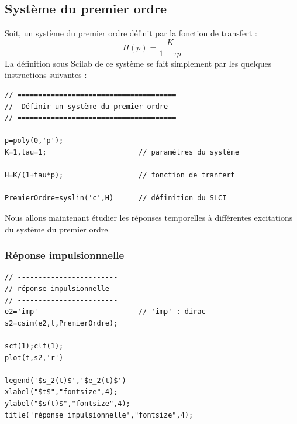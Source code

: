 \subsection{Système du premier ordre}
Soit, un système du premier ordre définit par la fonction de transfert : 
$$
H(p)=\dfrac{K}{1+\tau p }
$$
La définition sous Scilab de ce système se fait simplement par les quelques 
instructions suivantes :
\begin{code}
\begin{verbatim}
// ======================================
//  Définir un système du premier ordre
// ======================================

p=poly(0,'p');
K=1,tau=1;                      // paramètres du système

H=K/(1+tau*p);                  // fonction de tranfert

PremierOrdre=syslin('c',H)      // définition du SLCI
\end{verbatim}
\end{code}


Nous allons maintenant étudier les réponses temporelles 
à différentes excitations du système du premier ordre.
\subsubsection{Réponse impulsionnnelle}
\begin{code}
\begin{verbatim}
// ------------------------
// réponse impulsionnelle
// ------------------------
e2='imp'                        // 'imp' : dirac
s2=csim(e2,t,PremierOrdre);   

scf(1);clf(1);
plot(t,s2,'r')

legend('$s_2(t)$','$e_2(t)$')
xlabel("$t$","fontsize",4);
ylabel("$s(t)$","fontsize",4); 
title('réponse impulsionnelle',"fontsize",4);
\end{verbatim}
\end{code}

